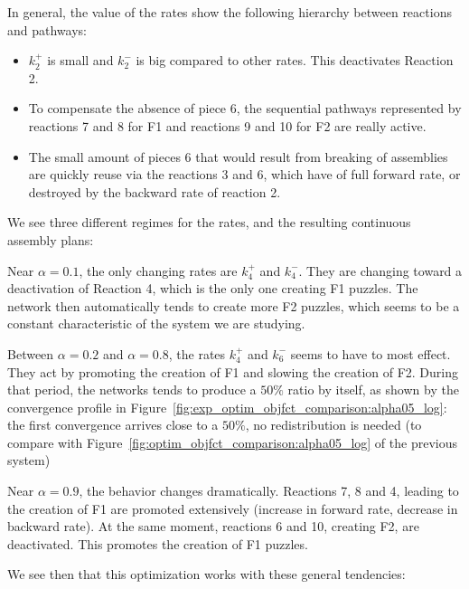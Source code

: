 		In general, the value of the rates show the following hierarchy between reactions and pathways:
		\begin{itemize}
			\item $k_2^+$ is small and $k_2^-$ is big compared to other rates. This deactivates Reaction 2.
			\item To compensate the absence of piece 6, the sequential pathways represented by reactions 7 and 8 for F1 and reactions 9 and 10 for F2 are really active.
			\item The small amount of pieces 6 that would result from breaking of assemblies are quickly reuse via the reactions 3 and 6, which have of full forward rate, or destroyed by the backward rate of reaction 2.
		\end{itemize}
		
		We see three different regimes for the rates, and the resulting continuous assembly plans:
		\begin{my_enumerate}
			\item Near $\alpha=0.1$, the only changing rates are $k_4^+$ and $k_4^-$. They are changing toward a deactivation of Reaction 4, which is the only one creating F1 puzzles. The network then automatically tends to create more F2 puzzles, which seems to be a constant characteristic of the system we are studying.
			\item Between $\alpha=0.2$ and $\alpha = 0.8$, the rates $k_4^+$ and $k_6^-$ seems to have to most effect. They act by promoting the creation of F1 and slowing the creation of F2. During that period, the networks tends to produce a $50\%$ ratio by itself, as shown by the convergence profile in Figure~\ref{fig:exp_optim_objfct_comparison:alpha05_log}: the first convergence arrives close to a $50\%$, no redistribution is needed (to compare with Figure~\ref{fig:optim_objfct_comparison:alpha05_log} of the previous system)
			\item Near $\alpha = 0.9$, the behavior changes dramatically. Reactions 7, 8 and 4, leading to the creation of F1 are promoted extensively (increase in forward rate, decrease in backward rate). At the same moment, reactions 6 and 10, creating F2, are deactivated. This promotes the creation of F1 puzzles.
		\end{my_enumerate}
		
		We see then that this optimization works with these general tendencies:
		
